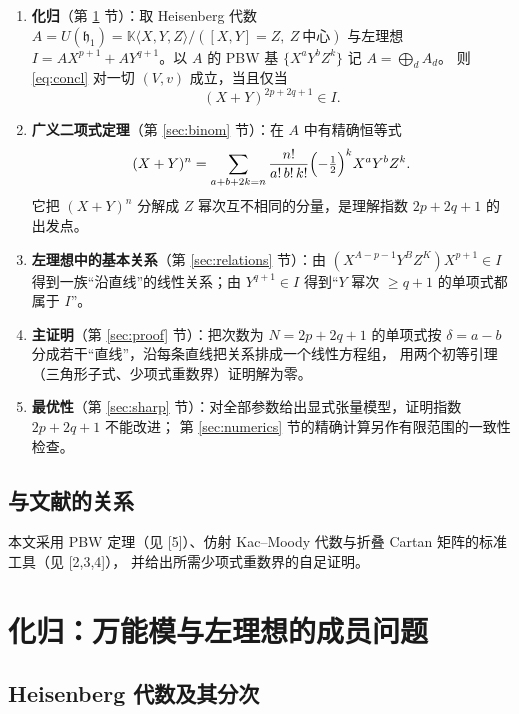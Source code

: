 \documentclass[11pt,UTF8]{ctexart}
\theoremstyle{definition}
\newcommand{\K}{\mathbb{K}}
\newcommand{\hh}{\mathfrak{h}}
\begin{document}
\begin{enumerate}[label=(\roman*)]
\item \textbf{化归}（第 \ref{sec:reduce} 节）：取 Heisenberg 代数
$A=U(\hh_1)=\K\langle X,Y,Z\rangle/([X,Y]=Z,\ Z\ \text{中心})$ 与左理想
$I=AX^{p+1}+AY^{q+1}$。以 $A$ 的 PBW 基 $\{X^aY^bZ^k\}$ 记 $A=\bigoplus_d A_d$。
则 \eqref{eq:concl} 对一切 $(V,v)$ 成立，当且仅当
\begin{equation}\label{eq:membership}
(X+Y)^{2p+2q+1}\in I .
\end{equation}
\item \textbf{广义二项式定理}（第 \ref{sec:binom} 节）：在 $A$ 中有精确恒等式
\begin{equation}\label{eq:trinomial}
(X+Y)^{n}=\sum_{a+b+2k=n}\frac{n!}{a!\,b!\,k!}\Bigl(-\tfrac12\Bigr)^{k}X^{a}Y^{b}Z^{k}.
\end{equation}
它把 $(X+Y)^n$ 分解成 $Z$ 幂次互不相同的分量，是理解指数 $2p+2q+1$ 的出发点。
\item \textbf{左理想中的基本关系}（第 \ref{sec:relations} 节）：由 $(X^{A-p-1}Y^BZ^K)X^{p+1}\in I$
得到一族“沿直线”的线性关系；由 $Y^{q+1}\in I$ 得到“$Y$ 幂次 $\ge q+1$ 的单项式都属于 $I$”。
\item \textbf{主证明}（第 \ref{sec:proof} 节）：把次数为 $N=2p+2q+1$ 的单项式按
$\delta=a-b$ 分成若干“直线”，沿每条直线把关系排成一个线性方程组，
用两个初等引理（三角形子式、少项式重数界）证明解为零。
\item \textbf{最优性}（第 \ref{sec:sharp} 节）：对全部参数给出显式张量模型，证明指数 $2p+2q+1$ 不能改进；
第 \ref{sec:numerics} 节的精确计算另作有限范围的一致性检查。
\end{enumerate}

\subsection{与文献的关系}

本文采用 PBW 定理（见 [5]）、仿射 Kac--Moody 代数与折叠 Cartan 矩阵的标准工具（见 [2,3,4]），
并给出所需少项式重数界的自足证明。

\section{化归：万能模与左理想的成员问题}\label{sec:reduce}

\subsection{Heisenberg 代数及其分次}
\end{document}
